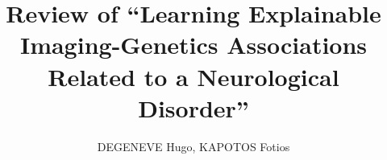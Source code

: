 \documentclass{article}
\begin{document}
\title{Review of ``Learning Explainable Imaging-Genetics Associations Related to a Neurological Disorder''}
\author{DEGENEVE Hugo, KAPOTOS Fotios}
\maketitle
\thispagestyle{empty}


\end{document}
